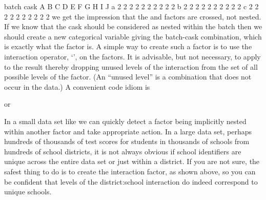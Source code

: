         batch
    cask A B C D E F G H I J
       a 2 2 2 2 2 2 2 2 2 2
       b 2 2 2 2 2 2 2 2 2 2
       c 2 2 2 2 2 2 2 2 2 2
we get the impression that the and factors are crossed, not nested. If we know that the cask should be considered as nested within the batch then we should create a new categorical variable giving the batch-cask combination, which is exactly what the factor is. A simple way to create such a factor is to use the interaction operator, ‘’, on the factors. It is advisable, but not necessary, to apply to the result thereby dropping unused levels of the interaction from the set of all possible levels of the factor. (An “unused level” is a combination that does not occur in the data.) A convenient code idiom is

or

In a small data set like we can quickly detect a factor being implicitly nested within another factor and take appropriate action. In a large data set, perhaps hundreds of thousands of test scores for students in thousands of schools from hundreds of school districts, it is not always obvious if school identifiers are unique across the entire data set or just within a district. If you are not sure, the safest thing to do is to create the interaction factor, as shown above, so you can be confident that levels of the district:school interaction do indeed correspond to unique schools.

